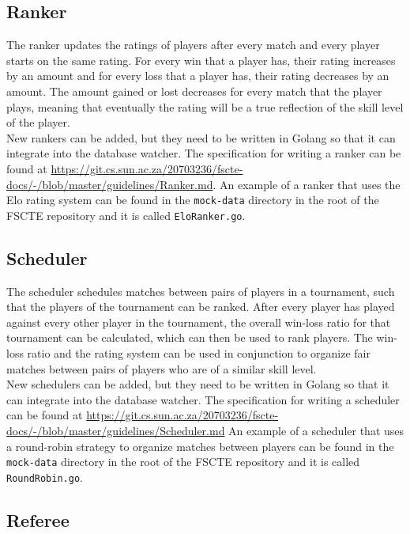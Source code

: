 \documentclass[a4paper, 11pt]{report}
\begin{document}
\subsection{Ranker}
\label{sec:ranker}

The ranker updates the ratings of players after every match and every player starts
on the same rating. For every win that a player has, their rating increases by
an amount and for every loss that a player has, their rating decreases by
an amount. The amount gained or lost decreases for every match that the player
plays, meaning that eventually the rating will be a true reflection of the skill
level of the player. \\

New rankers can be added, but they need to be written in Golang so that it can
integrate into the database watcher. The specification for writing a ranker can
be found at \url{https://git.cs.sun.ac.za/20703236/fscte-docs/-/blob/master/guidelines/Ranker.md}.
An example of a ranker that uses the Elo \cite{elo} rating system can be found in
the \texttt{mock-data} directory in the root of the FSCTE repository and it is
called \texttt{EloRanker.go}.

\subsection{Scheduler}
\label{sec:scheduler}

The scheduler schedules matches between pairs of players in a tournament, such
that the players of the tournament can be ranked. After every player has played
against every other player in the tournament, the overall win-loss ratio for
that tournament can be calculated, which can then be used to rank players. The
win-loss ratio and the rating system can be used in conjunction to organize fair
matches between pairs of players who are of a similar skill level. \\

New schedulers can be added, but they need to be written in Golang so that it
can integrate into the database watcher. The specification for writing a scheduler
can be found at \url{https://git.cs.sun.ac.za/20703236/fscte-docs/-/blob/master/guidelines/Scheduler.md}
An example of a scheduler that uses a round-robin strategy to organize matches
between players can be found in the \texttt{mock-data} directory in the root of
the FSCTE repository and it is called \texttt{RoundRobin.go}.

\subsection{Referee}
\label{sec:referee}
\end{document}
